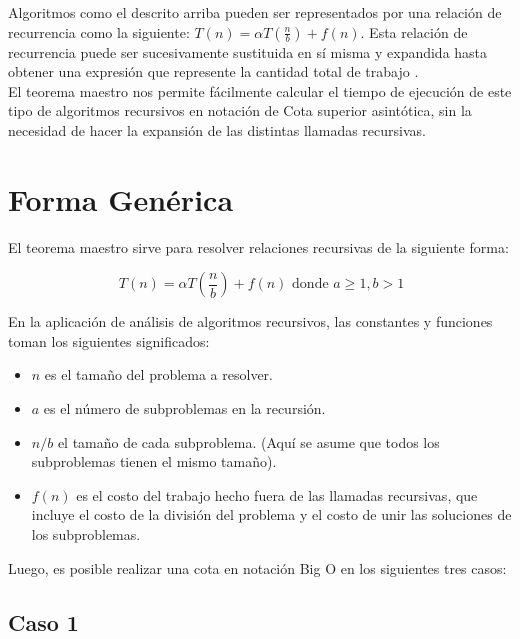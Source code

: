 \documentclass[12pt]{article} %
\begin{document}
\justify Algoritmos como el descrito arriba pueden ser representados por una relación de recurrencia como la siguiente: $T(n)=\alpha T({\frac{n}{b}})+f(n)$. Esta relación de recurrencia puede ser sucesivamente sustituida en sí misma y expandida hasta obtener una expresión que represente la cantidad total de trabajo \cite{dertat_2017}.\\

\justify El teorema maestro nos permite fácilmente calcular el tiempo de ejecución de este tipo de algoritmos recursivos en notación de Cota superior asintótica, sin la necesidad de hacer la expansión de las distintas llamadas recursivas.\\

\section{Forma Genérica}
\vspace{-0.5cm}
\hrulefill
\justify El teorema maestro sirve para resolver relaciones recursivas de la siguiente forma:

\begin{flushleft}
    \begin{equation*}
        \ T(n)=\alpha T\left(\frac{n}{b}\right) + f(n) \text{   donde  } a \geq{1}, b>1
    \end{equation*}
\end{flushleft}

\justify En la aplicación de análisis de algoritmos recursivos, las constantes y funciones toman los siguientes significados:

\begin{itemize}
    \item $n$ es el tamaño del problema a resolver.
    \item $a$ es el número de subproblemas en la recursión.
    \item $n/b$ el tamaño de cada subproblema. (Aquí se asume que todos los subproblemas tienen el mismo tamaño).
    \item $f (n)$ es el costo del trabajo hecho fuera de las llamadas recursivas, que incluye el costo de la división del problema y el costo de unir las soluciones de los subproblemas.
\end{itemize}

\justify Luego, es posible realizar una cota en notación Big O en los siguientes tres casos:



\subsection{Caso 1}
\end{document}
